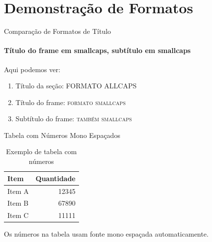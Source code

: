 \documentclass[10pt]{beamer}
\begin{document}
\section{Demonstração de Formatos}
\begin{frame}{Comparação de Formatos de Título}
  \framesubtitle{Título do frame em smallcaps, subtítulo em smallcaps}
  
  Aqui podemos ver:
  \begin{enumerate}
    \item Título da seção: \MakeUppercase{formato allcaps}
    \item Título do frame: \textsc{formato smallcaps}
    \item Subtítulo do frame: \textsc{também smallcaps}
  \end{enumerate}
\end{frame}

\begin{frame}{Tabela com Números Mono Espaçados}
  \begin{table}
    \caption{Exemplo de tabela com números}
    \begin{tabular}{lr}
      \hline
      Item & Quantidade \\
      \hline
      Item A & 12345 \\
      Item B & 67890 \\
      Item C & 11111 \\
      \hline
    \end{tabular}
  \end{table}
  
  Os números na tabela usam fonte mono espaçada automaticamente.
\end{frame}
\end{document}
